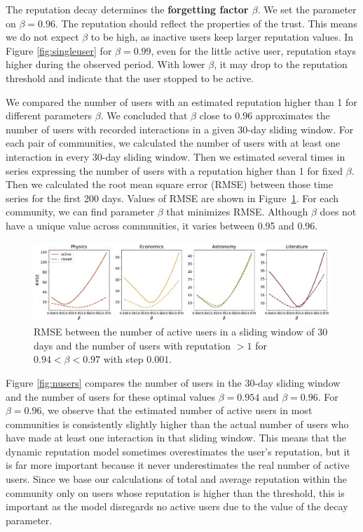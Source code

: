 The reputation decay determines the \textbf{forgetting factor $\beta$}. We set the parameter on $\beta=0.96$. The reputation should reflect the properties of the trust. This means we do not expect $\beta$ to be high, as inactive users keep larger reputation values. In Figure \ref{fig:singleuser} for $\beta=0.99$, even for the little active user, reputation stays higher during the observed period. With lower $\beta$, it may drop to the reputation threshold and indicate that the user stopped to be active.  

We compared the number of users with an estimated reputation higher than 1 for different parameters $\beta$. We concluded that $\beta$ close to $0.96$ approximates the number of users with recorded interactions in a given 30-day sliding window. For each pair of communities, we calculated the number of users with at least one interaction in every 30-day sliding window. Then we estimated several times in series expressing the number of users with a reputation higher than 1 for fixed $\beta$. Then we calculated the root mean square error (RMSE) between those time series for the first 200 days. Values of RMSE are shown in Figure~\ref{fig:rmse}. For each community, we can find parameter $\beta$ that minimizes RMSE. Although $\beta$ does not have a unique value across communities, it varies between 0.95 and 0.96.  

\begin{figure}[h!]
	\centering
	\includegraphics[width=\linewidth]{figures/stackexchange/rmse.pdf}
	\caption[RMSE between the number of users in 30 days sliding window and positive reputation.]{RMSE between the number of active users in a sliding window of 30 days and the number of users with reputation $>1$ for  $0.94< \beta <0.97$ with step $0.001$. }
	\label{fig:rmse}
\end{figure}

Figure \ref{fig:nusers} compares the number of users in the 30-day sliding window and the number of users for these optimal values $\beta = 0.954$ and $\beta =0.96$. For $\beta = 0.96$, we observe that the estimated number of active users in most communities is consistently slightly higher than the actual number of users who have made at least one interaction in that sliding window. This means that the dynamic reputation model sometimes overestimates the user's reputation, but it is far more important because it never underestimates the real number of active users. Since we base our calculations of total and average reputation within the community only on users whose reputation is higher than the threshold, this is important as the model disregards no active users due to the value of the decay parameter.

